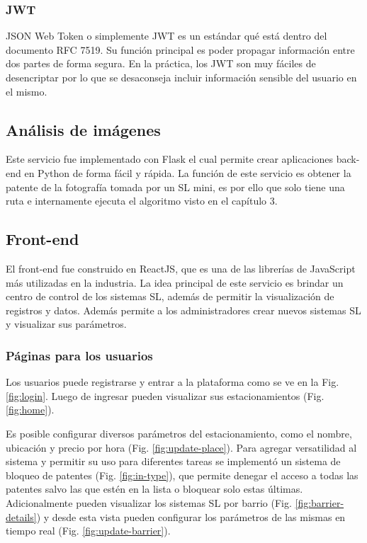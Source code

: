 \subsubsection{JWT}

JSON Web Token o simplemente JWT es un estándar qué está dentro del documento RFC 7519. Su función principal es poder propagar información entre dos partes de forma segura. En la práctica, los JWT son muy fáciles de desencriptar por lo que se desaconseja incluir información sensible del usuario en el mismo.

\subsection{Análisis de imágenes}

Este servicio fue implementado con Flask el cual permite crear aplicaciones back-end en Python de forma fácil y rápida. La función de este servicio es obtener la patente de la fotografía tomada por un SL mini, es por ello que solo tiene una ruta e internamente ejecuta el algoritmo visto en el capítulo 3.

\subsection{Front-end}

El front-end fue construido en ReactJS, que es una de las librerías de JavaScript más utilizadas en la industria. La idea principal de este servicio es brindar un centro de control de los sistemas SL, además de permitir la visualización de registros y datos. Además permite a los administradores crear nuevos sistemas SL y visualizar sus parámetros.

\subsubsection{Páginas para los usuarios}

Los usuarios puede registrarse y entrar a la plataforma como se ve en la Fig. \ref{fig:login}. Luego de ingresar pueden visualizar sus estacionamientos (Fig. \ref{fig:home}).

Es posible configurar diversos parámetros del estacionamiento, como el nombre, ubicación y precio por hora (Fig. \ref{fig:update-place}).
Para agregar versatilidad al sistema y permitir su uso para diferentes tareas se implementó un sistema de bloqueo de patentes (Fig. \ref{fig:in-type}), que permite denegar el acceso a  todas las patentes salvo las que estén en la lista o bloquear solo estas últimas. Adicionalmente pueden visualizar los sistemas SL por barrio (Fig. \ref{fig:barrier-details}) y desde esta vista pueden configurar los parámetros de las mismas en tiempo real (Fig. \ref{fig:update-barrier}).

